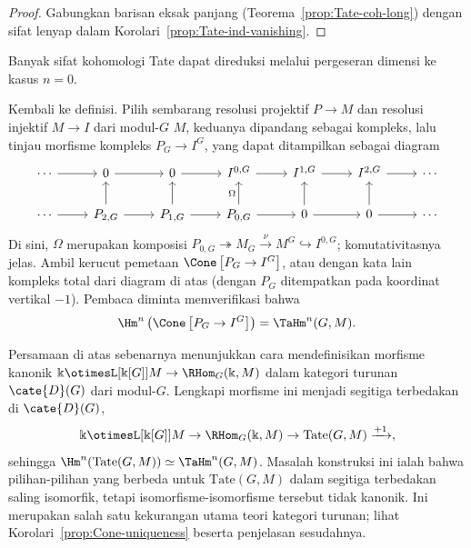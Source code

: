 \begin{proof}
	Gabungkan barisan eksak panjang
	(Teorema~\ref{prop:Tate-coh-long}) dengan sifat lenyap dalam
	Korolari~\ref{prop:Tate-ind-vanishing}.
\end{proof}

Banyak sifat kohomologi Tate dapat direduksi melalui pergeseran dimensi ke
kasus $n=0$.

Kembali ke definisi. Pilih sembarang resolusi projektif $P\to M$ dan resolusi
injektif $M\to I$ dari modul-$G$ $M$, keduanya dipandang sebagai kompleks, lalu
tinjau morfisme kompleks $P_G\to I^G$, yang dapat ditampilkan sebagai diagram
\[\begin{tikzcd}
	\cdots \arrow[r] & 0 \arrow[r] & 0 \arrow[r] & I^{0, G} \arrow[r] & I^{1, G} \arrow[r] & I^{2, G} \arrow[r] & \cdots \\
	\cdots \arrow[r] & P_{2, G} \arrow[r] \arrow[u] & P_{1, G} \arrow[r] \arrow[u] & P_{0, G} \arrow[u, "\Omega"] \arrow[r] & 0 \arrow[r] \arrow[u] & 0 \arrow[r] \arrow[u] & \cdots
\end{tikzcd}\]
Di sini, $\Omega$ merupakan komposisi
$P_{0,G}\twoheadrightarrow M_G\xrightarrow{\nu}M^G\hookrightarrow I^{0,G}$;
komutativitasnya jelas. Ambil kerucut pemetaan
$\Cone\left[P_G\to I^G\right]$, atau dengan kata lain kompleks total dari
diagram di atas (dengan $P_G$ ditempatkan pada koordinat vertikal $-1$).
Pembaca diminta memverifikasi bahwa
\begin{equation}\label{eqn:Tate-cone-1}
	\Hm^n\left( \Cone\left[P_G \to I^G\right] \right) = \TaHm^n(G, M).
\end{equation}

Persamaan di atas sebenarnya menunjukkan cara mendefinisikan morfisme kanonik
$\Bbbk \otimesL[{\Bbbk[G]}] M \to \RHom_G(\Bbbk, M)$ dalam kategori turunan
$\cate{D}(G)$ dari modul-$G$. Lengkapi morfisme ini menjadi segitiga
terbedakan di $\cate{D}(G)$,
\[ \Bbbk \otimesL[{\Bbbk[G]}] M \to \RHom_G(\Bbbk, M) \to \mathrm{Tate}(G, M) \xrightarrow{+1}, \]
sehingga
$\Hm^n(\mathrm{Tate}(G,M))\simeq\TaHm^n(G,M)$. Masalah konstruksi ini ialah
bahwa pilihan-pilihan yang berbeda untuk $\mathrm{Tate}(G,M)$ dalam segitiga
terbedakan saling isomorfik, tetapi isomorfisme-isomorfisme tersebut tidak
kanonik. Ini merupakan salah satu kekurangan utama teori kategori turunan;
lihat Korolari~\ref{prop:Cone-uniqueness} beserta penjelasan sesudahnya.

